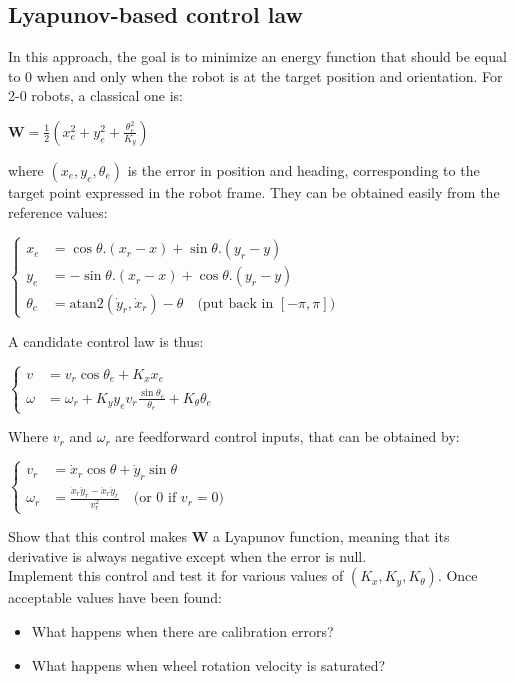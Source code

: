 \documentclass{ecnreport}
\begin{document}
\subsection{Lyapunov-based control law}

In this approach, the goal is to minimize an energy function that should be equal to 0 when and only when the robot is at the target position and orientation. For 2-0 robots, a classical one is:
\def\W{\mathbf{W}}
\begin{center}
 $\W = \displaystyle \frac{1}{2}\left(x_e^2 + y_e^2 + \frac{\theta_e^2}{K_y}\right)$
\end{center}
where $(x_e, y_e, \theta_e)$ is the error in position and heading, corresponding to the target point expressed in the robot frame. They can be obtained easily from the reference values:
\begin{center}
 $\left\{\begin{array}{ll}
  x_e &= \cos\theta.(x_r-x) + \sin\theta.(y_r-y) \\
  y_e &= -\sin\theta.(x_r-x) + \cos\theta.(y_r-y) \\
  \theta_e &= \text{atan2}(\dot y_r, \dot x_r) - \theta \quad  \text{(put back in } [-\pi, \pi]\text{)}
\end{array}\right.$
\end{center}
A candidate control law is thus:
\begin{center}
 $\left\{\begin{array}{ll}
          v &= v_r\cos\theta_e + K_x x_e \\
          \omega &= \displaystyle\omega_r + K_y y_e v_r \frac{\sin\theta_e}{\theta_e} + K_\theta \theta_e
         \end{array}\right.$
\end{center}
Where $v_r$ and $\omega_r$ are feedforward control inputs, that can be obtained by:
\begin{center}
 $\left\{\begin{array}{ll} 
          v_r &= \dot x_r\cos\theta + \dot y_r \sin\theta \\
          \omega_r &= \displaystyle\frac{\dot x_r \ddot y_r - \ddot x_r \dot y_r}{v_r^2}\quad  \text{(or 0 if } v_r = 0\text{)}
         \end{array}\right.$
\end{center}
Show that this control makes $\W$ a Lyapunov function, meaning that its derivative is always negative except when the error is null.\\

Implement this control and test it for various values of $(K_x, K_y, K_\theta)$. Once acceptable values have been found:
\begin{itemize}
 \item What happens when there are calibration errors?
 \item What happens when wheel rotation velocity is saturated?
\end{itemize} 
\end{document}
